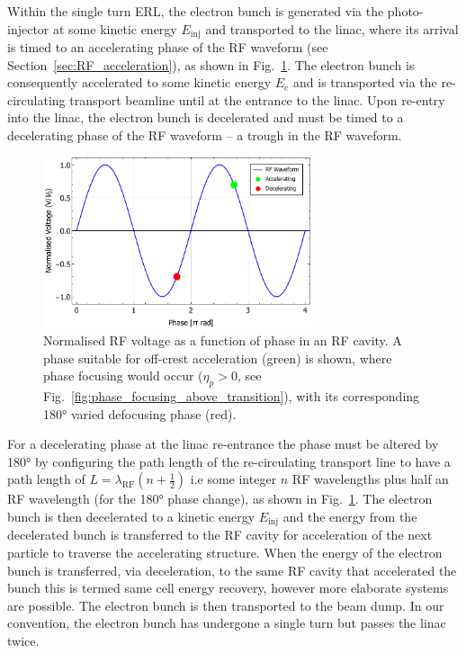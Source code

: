 \documentclass[../main.tex]{subfiles}
\begin{document}
Within the single turn ERL, the electron bunch is generated via the photo-injector at some kinetic energy $E_{\mathrm{inj}}$ and transported to the linac, where its arrival is timed to an accelerating phase of the RF waveform (see Section~\ref{sec:RF_acceleration}), as shown in Fig.~\ref{eq:ERL_RF_acceleration_phase}. The electron bunch is consequently accelerated to some kinetic energy $E_{e}$ and is transported via the re-circulating transport beamline until at the entrance to the linac. Upon re-entry into the linac, the electron bunch is decelerated and must be timed to a decelerating phase of the RF waveform -- a trough in the RF waveform. 

\begin{figure}[!h]
\centering
\includegraphics[width=0.7\textwidth]{Figures/Energy_Recovery_Linac_Design/ERL_acc_deacc_RF_phase.pdf}
\caption{Normalised RF voltage as a function of phase in an RF cavity. A phase suitable for off-crest acceleration (green) is shown, where phase focusing would occur ($\eta_{p}>0$, see Fig.~\ref{fig:phase_focusing_above_transition}), with its corresponding 180\si{\degree} varied defocusing phase (red).}
\label{eq:ERL_RF_acceleration_phase}
\end{figure}

For a decelerating phase at the linac re-entrance the phase must be altered by 180\si{\degree} by configuring the path length of the re-circulating transport line to have a path length of $L= \lambda_{\mathrm{RF}}\left(n+\frac{1}{2}\right)$ i.e some integer $n$ RF wavelengths plus half an RF wavelength (for the 180\si{\degree} phase change), as shown in Fig.~\ref{eq:ERL_RF_acceleration_phase}. The electron bunch is then decelerated to a kinetic energy $E_{\mathrm{inj}}$ and the energy from the decelerated bunch is transferred to the RF cavity for acceleration of the next particle to traverse the accelerating structure. When the energy of the electron bunch is transferred, via deceleration, to the same RF cavity that accelerated the bunch this is termed same cell energy recovery, however more elaborate systems are possible. The electron bunch is then transported to the beam dump. In our convention, the electron bunch has undergone a single turn but passes the linac twice.
\end{document}
